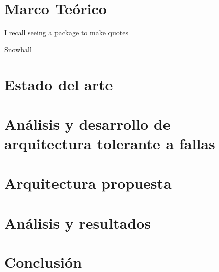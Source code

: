 \documentclass[11pt, a4paper, twoside]{report}
\begin{document}
\chapter{Marco Teórico}\label{chap:marco_teorico}
\epigraph{I recall seeing a package to make quotes}{Snowball}

\chapter{Estado del arte}\label{chap:estado_del_arte}

\chapter{Análisis y desarrollo de arquitectura tolerante a fallas}

\chapter{Arquitectura propuesta}

\chapter{Análisis y resultados}

\chapter{Conclusión}
%

%
%
%
%
%


\newpage
\nocite{*}

%


\appendix

 
\newpage
$\ $
\thispagestyle{empty} %
\newpage
$\ $
\thispagestyle{empty}
\end{document}
